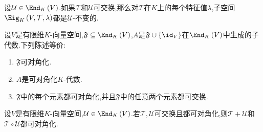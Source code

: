 \begin{lemma}{}{}
	设$\mathcal{U}\in\End_{K}\left(V\right)$.如果$\mathcal{T}$和$\mathcal{U}$可交换,那么对$\mathcal{T}$在$K$上的每个特征值$\lambda$,子空间$\Eig_{K}\left(V,\mathcal{T},\lambda\right)$都是$\mathcal{U}$-不变的.
\end{lemma}

\begin{proposition}{}{}
	设$V$是有限维$K$-向量空间,$\mathfrak{F}\subseteq\End_{K}\left(V\right)$,$A$是$\mathfrak{F}\cup\left\{\id_{V}\right\}$在$\End_{K}\left(V\right)$中生成的子代数.下列陈述等价:
	\begin{enumerate}
		\item $\mathfrak{F}$可对角化.
		\item $A$是可对角化$K$-代数.
		\item $\mathfrak{F}$中的每个元素都可对角化,并且$\mathfrak{F}$中的任意两个元素都可交换.
	\end{enumerate}
\end{proposition}

\begin{corollary}{}{}
	设$V$是有限维$K$-向量空间,$\mathcal{U}\in\End_{K}\left(V\right)$.若$\mathcal{T},\mathcal{U}$可交换且都可对角化,则$\mathcal{T}+\mathcal{U}$和$\mathcal{T}\circ\mathcal{U}$都可对角化.
\end{corollary}
